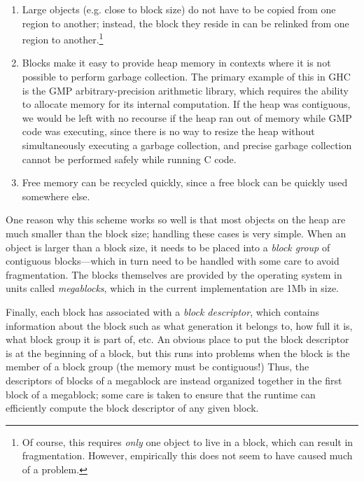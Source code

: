 \begin{enumerate}
    \item Large objects (e.g. close to block size) do not have to be copied from one region to
        another; instead, the block they reside in can be relinked from
        one region to another.\footnote{Of course, this requires \emph{only}
        one object to live in a block, which can result in fragmentation.
        However, empirically this does not seem to have caused much of a problem.}
    \item Blocks make it easy to provide heap memory in contexts where it is
        not possible to perform garbage collection.  The primary example of this
        in GHC is the GMP arbitrary-precision arithmetic library, which requires
        the ability to allocate memory for its internal computation.  If the heap
        was contiguous, we would be left with no recourse if the heap ran out
        of memory while GMP code was executing, since there is no way to resize
        the heap without simultaneously executing a garbage collection, and
        precise garbage collection cannot be performed safely while running C code.
    \item Free memory can be recycled quickly, since a free block can be quickly
        used somewhere else.
\end{enumerate}

One reason why this scheme works so well is that most objects on the
heap are much smaller than the block size; handling these cases is very
simple.  When an object is larger than a block size, it needs to be
placed into a \emph{block group} of contiguous blocks---which in turn
need to be handled with some care to avoid fragmentation.  The blocks
themselves are provided by the operating system in units called
\emph{megablocks}, which in the current implementation are 1Mb in size.

Finally, each block has associated with a \emph{block descriptor}, which
contains information about the block such as what generation it belongs to, how full it is, what block
group it is part of, etc.  An obvious place to put the block descriptor
is at the beginning of a block, but this runs into problems when the block
is the member of a block group (the memory must be contiguous!)
Thus, the descriptors of blocks of a megablock are instead organized together
in the first block of a megablock; some care is taken to ensure that the
runtime can efficiently compute the block descriptor of any given block.

